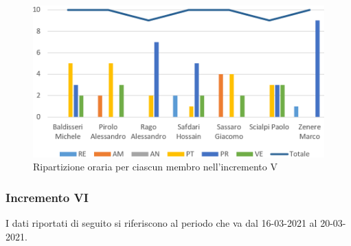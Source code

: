 \begin{figure}[!htb]   
    \centering
    \includegraphics[width=.95\textwidth]{Images/prev5}
	\caption{Ripartizione oraria per ciascun membro nell'incremento V}
\end{figure}

\subsubsection{Incremento VI}

I dati riportati di seguito si riferiscono al periodo che va dal 16-03-2021 al 20-03-2021.

